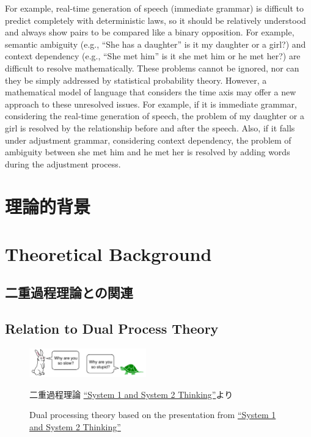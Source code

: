 \documentclass[a4paper,xelatex,ja=standard]{bxjsarticle}
\begin{document}
For example, real-time generation of speech (immediate grammar) is difficult to predict completely with deterministic laws, so it should be relatively understood and always show pairs to be compared like a binary opposition.
For example, semantic ambiguity (e.g., ``She has a daughter'' is it my daughter or a girl?) and context dependency (e.g., ``She met him'' is it she met him or he met her?) are difficult to resolve mathematically.
These problems cannot be ignored, nor can they be simply addressed by statistical probability theory.
However, a mathematical model of language that considers the time axis may offer a new approach to these unresolved issues.
For example, if it is immediate grammar, considering the real-time generation of speech, the problem of my daughter or a girl is resolved by the relationship before and after the speech.
Also, if it falls under adjustment grammar, considering context dependency, the problem of ambiguity between she met him and he met her is resolved by adding words during the adjustment process.
    \fi

\ifJPN
\section{理論的背景}
\else
\section{Theoretical Background}
\fi

\ifJPN
  \subsection{二重過程理論との関連}
\else
  \subsection{Relation to Dual Process Theory}
\fi

\begin{figure}[htb]\centering\small
\includegraphics[width=0.45\textwidth]{./figures/fastslow01.pdf} 
\ifJPN
  \caption{二重過程理論 \href{https://thedecisionlab.com/reference-guide/philosophy/system-1-and-system-2-thinking}{``System 1 and System 2 Thinking''}より}\label{fig:fastslow01}
\else
  \caption{Dual processing theory based on the presentation from \href{https://thedecisionlab.com/reference-guide/philosophy/system-1-and-system-2-thinking}{``System 1 and System 2 Thinking''}}\label{fig:fastslow01}
\fi
\end{figure}
\end{document}
